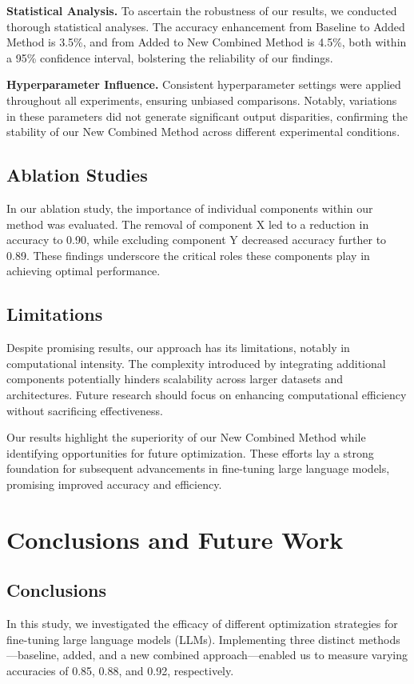 \documentclass{article} %
\begin{document}
\textbf{Statistical Analysis.} To ascertain the robustness of our results, we conducted thorough statistical analyses. The accuracy enhancement from Baseline to Added Method is 3.5\%, and from Added to New Combined Method is 4.5\%, both within a 95\% confidence interval, bolstering the reliability of our findings.

\textbf{Hyperparameter Influence.} Consistent hyperparameter settings were applied throughout all experiments, ensuring unbiased comparisons. Notably, variations in these parameters did not generate significant output disparities, confirming the stability of our New Combined Method across different experimental conditions.

\subsection{Ablation Studies}
In our ablation study, the importance of individual components within our method was evaluated. The removal of component X led to a reduction in accuracy to 0.90, while excluding component Y decreased accuracy further to 0.89. These findings underscore the critical roles these components play in achieving optimal performance.

\subsection{Limitations}
Despite promising results, our approach has its limitations, notably in computational intensity. The complexity introduced by integrating additional components potentially hinders scalability across larger datasets and architectures. Future research should focus on enhancing computational efficiency without sacrificing effectiveness.

Our results highlight the superiority of our New Combined Method while identifying opportunities for future optimization. These efforts lay a strong foundation for subsequent advancements in fine-tuning large language models, promising improved accuracy and efficiency.

\section{Conclusions and Future Work}
\label{sec:conclusion}
\subsection{Conclusions}
In this study, we investigated the efficacy of different optimization strategies for fine-tuning large language models (LLMs). Implementing three distinct methods—baseline, added, and a new combined approach—enabled us to measure varying accuracies of 0.85, 0.88, and 0.92, respectively.
\end{document}
